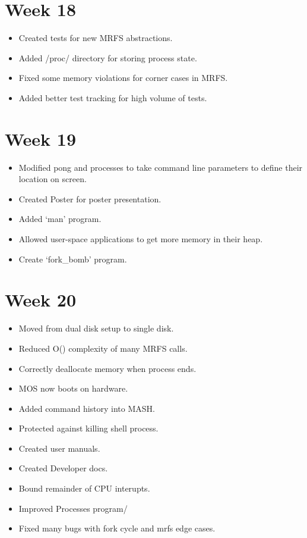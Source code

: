 \documentclass[a4paper]{report}
\begin{document}
\section{Week 18}
\begin{itemize}
\item Created tests for new MRFS abstractions.
\item Added /proc/ directory for storing process state.
\item Fixed some memory violations for corner cases in MRFS.
\item Added better test tracking for high volume of tests.
\end{itemize}

\section{Week 19}
\begin{itemize}
\item Modified pong and processes to take command line parameters to define their location on screen.
\item Created Poster for poster presentation.
\item Added `man' program.
\item Allowed user-space applications to get more memory in their heap.
\item Create `fork\_bomb' program.
\end{itemize}

\section{Week 20}
\begin{itemize}
\item Moved from dual disk setup to single disk.
\item Reduced O() complexity of many MRFS calls.
\item Correctly deallocate memory when process ends.
\item MOS now boots on hardware.
\item Added command history into MASH.
\item Protected against killing shell process.
\item Created user manuals.
\item Created Developer docs.
\item Bound remainder of CPU interupts.
\item Improved Processes program/
\item Fixed many bugs with fork cycle and mrfs edge cases.
\end{itemize}
\end{document}
